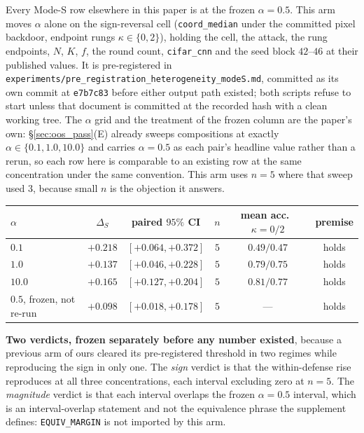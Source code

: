 \documentclass{article}
\begin{document}
Every Mode-S row elsewhere in this paper is at the frozen $\alpha{=}0.5$. This arm moves $\alpha$ alone on the sign-reversal cell (\texttt{coord\_median} under the committed pixel backdoor, endpoint rungs $\kappa\in\{0,2\}$), holding the cell, the attack, the rung endpoints, $N$, $K$, $f$, the round count, \texttt{cifar\_cnn} and the seed block $42$--$46$ at their published values. It is pre-registered in \texttt{experiments/\allowbreak pre\_registration\_heterogeneity\_modeS.md}, committed as its own commit at \texttt{e7b7c83} before either output path existed; both scripts refuse to start unless that document is committed at the recorded hash with a clean working tree. The $\alpha$ grid and the treatment of the frozen column are the paper's own: §\ref{sec:oos_pass}(E) already sweeps compositions at exactly $\alpha \in \{0.1, 1.0, 10.0\}$ and carries $\alpha{=}0.5$ as each pair's headline value rather than a rerun, so each row here is comparable to an existing row at the same concentration under the same convention. This arm uses $n{=}5$ where that sweep used $3$, because small $n$ is the objection it answers.

\begin{center}
\begin{tabular}{lccccc}
\toprule
$\alpha$ & $\Delta_S$ & paired $95\%$ CI & $n$ & mean acc.\ $\kappa{=}0/2$ & premise \\
\midrule
$0.1$ & $+0.218$ & $[+0.064, +0.372]$ & $5$ & $0.49/0.47$ & holds \\
$1.0$ & $+0.137$ & $[+0.046, +0.228]$ & $5$ & $0.79/0.75$ & holds \\
$10.0$ & $+0.165$ & $[+0.127, +0.204]$ & $5$ & $0.81/0.77$ & holds \\
\midrule
$0.5$, frozen, not re-run & $+0.098$ & $[+0.018, +0.178]$ & $5$ & --- & holds \\
\bottomrule
\end{tabular}
\end{center}

\textbf{Two verdicts, frozen separately before any number existed}, because a previous arm of ours cleared its pre-registered threshold in two regimes while reproducing the sign in only one. The \emph{sign} verdict is that the within-defense rise reproduces at all three concentrations, each interval excluding zero at $n{=}5$. The \emph{magnitude} verdict is that each interval overlaps the frozen $\alpha{=}0.5$ interval, which is an interval-overlap statement and not the equivalence phrase the supplement defines: \texttt{EQUIV\_MARGIN} is not imported by this arm.
\end{document}
